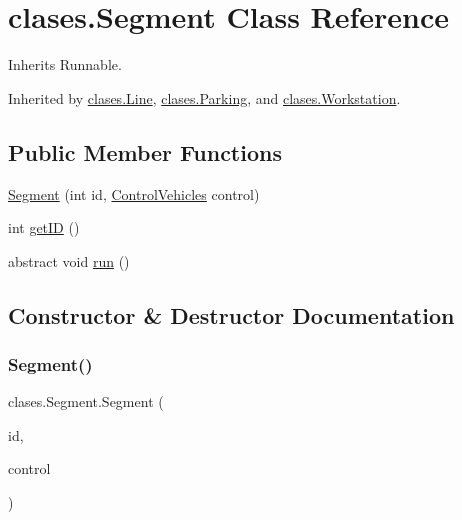 \hypertarget{classclases_1_1_segment}{}\section{clases.\+Segment Class Reference}
\label{classclases_1_1_segment}


Inherits Runnable.



Inherited by \mbox{\hyperlink{classclases_1_1_line}{clases.\+Line}}, \mbox{\hyperlink{classclases_1_1_parking}{clases.\+Parking}}, and \mbox{\hyperlink{classclases_1_1_workstation}{clases.\+Workstation}}.

\subsection*{Public Member Functions}
\begin{DoxyCompactItemize}
\item 
\mbox{\hyperlink{classclases_1_1_segment_a2f51041ae9ba2130c61f731069b05dc5}{Segment}} (int id, \mbox{\hyperlink{classcontrol_1_1_control_vehicles}{Control\+Vehicles}} control)
\item 
int \mbox{\hyperlink{classclases_1_1_segment_ae3955a30788c0797ec6c9068a3bce050}{get\+ID}} ()
\item 
abstract void \mbox{\hyperlink{classclases_1_1_segment_ab3f7658070f0da15727d8d852df0073b}{run}} ()
\end{DoxyCompactItemize}


\subsection{Constructor \& Destructor Documentation}
\mbox{\label{classclases_1_1_segment_a2f51041ae9ba2130c61f731069b05dc5}} 
\subsubsection{\texorpdfstring{Segment()}{Segment()}}
{\footnotesize\ttfamily clases.\+Segment.\+Segment (\begin{DoxyParamCaption}\item[{int}]{id,  }\item[{\mbox{\hyperlink{classcontrol_1_1_control_vehicles}{Control\+Vehicles}}}]{control }\end{DoxyParamCaption})}



